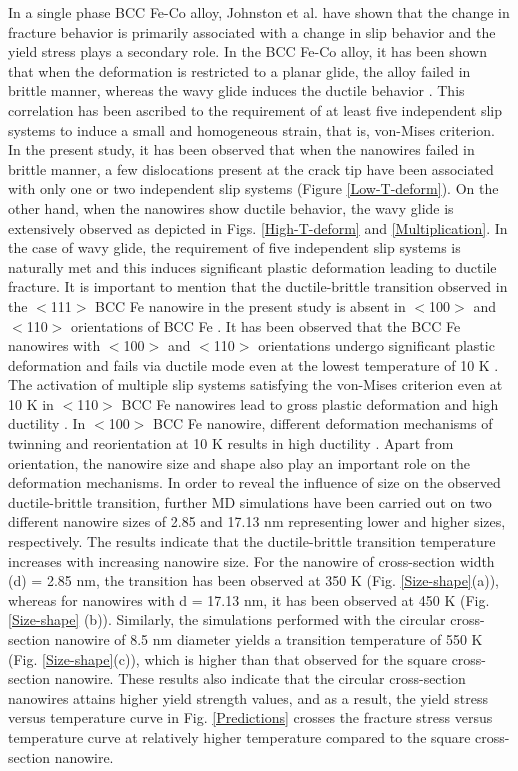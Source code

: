 \documentclass[%
reprint,%
 amssymb, amsmath,%
 aip,apl,%
]{revtex4-1}
\begin{document}
In a single phase BCC Fe-Co alloy, Johnston et al. \cite{Johnston} have shown that the change in fracture behavior is primarily
associated with a change in slip behavior and the yield stress plays a secondary role. In the BCC Fe-Co alloy, it has been shown 
that when the deformation is restricted to a planar glide, the alloy failed in brittle manner, whereas the wavy glide induces the 
ductile behavior \cite{Johnston}. This correlation has been ascribed to the requirement of at least five independent slip systems 
to induce a small and homogeneous strain, that is, von-Mises criterion. In the present study, it has been observed that when the 
nanowires failed in brittle manner, a few dislocations present at the crack tip have been associated with only one or two independent 
slip systems (Figure \ref{Low-T-deform}). On the other hand, when the nanowires show ductile behavior, the wavy glide is extensively 
observed as depicted in Figs. \ref{High-T-deform} and \ref{Multiplication}. In the case of wavy glide, the requirement of five 
independent slip systems is naturally met and this induces significant plastic deformation leading to ductile fracture. It is 
important to mention that the ductile-brittle transition observed in the $<$111$>$ BCC Fe nanowire in the present study is absent 
in $<$100$>$ and $<$110$>$ orientations of BCC Fe \cite{Sai-CMS15,Sai-MSEA15}. It has been observed that the BCC Fe nanowires
with $<$100$>$ and $<$110$>$ orientations undergo significant plastic deformation and fails via ductile mode even at the lowest
temperature of 10 K \cite{Sai-CMS15,Sai-MSEA15}. The activation of multiple slip systems satisfying the von-Mises criterion even 
at 10 K in $<$110$>$ BCC Fe nanowires lead to gross plastic deformation and high ductility \cite{Sai-MSEA15}. In $<$100$>$ BCC Fe 
nanowire, different deformation mechanisms of twinning and reorientation at 10 K results in high ductility \cite{Sai-CMS15}. Apart 
from orientation, the nanowire size and shape also play an important role on the deformation mechanisms. In order to reveal the 
influence of size on the observed ductile-brittle transition, further MD simulations have been carried out on two different nanowire 
sizes of 2.85 and 17.13 nm representing lower and higher sizes, respectively. The results indicate that the ductile-brittle transition 
temperature increases with increasing nanowire size. For the nanowire of cross-section width (d) = 2.85 nm, the transition has been 
observed at 350 K (Fig. \ref{Size-shape}(a)), whereas for nanowires with d = 17.13 nm, it has been observed at 450 K (Fig. \ref{Size-shape}
(b)). Similarly, the simulations performed with the circular cross-section nanowire of 8.5 nm diameter yields a transition temperature 
of 550 K (Fig. \ref{Size-shape}(c)), which is higher than that observed for the square cross-section nanowire. These results also 
indicate that the circular cross-section nanowires attains higher yield strength values, and as a result, the yield stress versus 
temperature curve in Fig. \ref{Predictions} crosses the fracture stress versus temperature curve at relatively higher temperature 
compared to the square cross-section nanowire.
\end{document}
